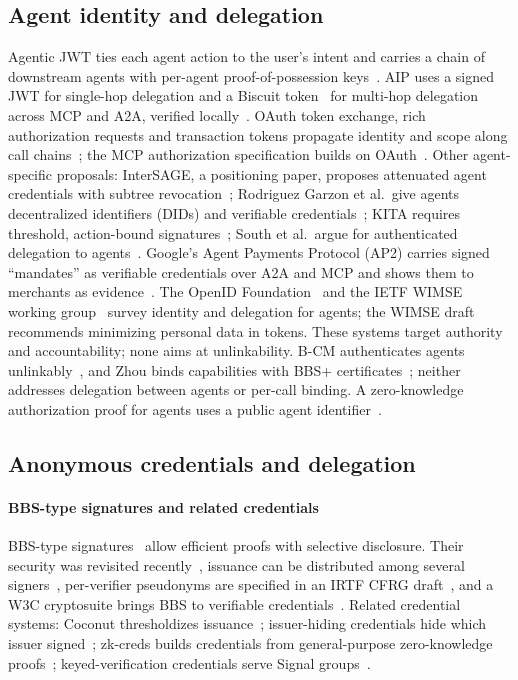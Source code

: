 \subsection{Agent identity and delegation}
Agentic JWT ties each agent action to the user's intent and carries a chain of downstream agents with per-agent proof-of-possession keys~\cite{goswami2025ajwt}. AIP uses a signed JWT for single-hop delegation and a Biscuit token~\cite{biscuit} for multi-hop delegation across MCP and A2A, verified locally~\cite{prakash2026aip}. OAuth token exchange, rich authorization requests and transaction tokens propagate identity and scope along call chains~\cite{rfc8693,rfc9396,tulshibagwale2026txntokens}; the MCP authorization specification builds on OAuth~\cite{mcpauth}. Other agent-specific proposals:
InterSAGE, a positioning paper, proposes attenuated agent credentials with subtree revocation~\cite{zou2026intersage}; Rodriguez Garzon et al.\ give agents decentralized identifiers (DIDs) and verifiable credentials~\cite{garzon2026didvc}; KITA requires threshold, action-bound signatures~\cite{zheng2026kita}; South et al.\ argue for authenticated delegation to agents~\cite{south2025icml}.
Google's Agent Payments Protocol (AP2) carries signed ``mandates'' as verifiable credentials over A2A and MCP and shows them to merchants as evidence~\cite{ap2-2025}. The OpenID Foundation~\cite{south2025idmgmt} and the IETF WIMSE working group~\cite{kasselman2026aims} survey identity and delegation for agents; the WIMSE draft recommends minimizing personal data in tokens. These systems target authority and accountability; none aims at unlinkability. B-CM authenticates agents unlinkably~\cite{liu2026bcm}, and Zhou binds capabilities with BBS+ certificates~\cite{zhou2026capbinding}; neither addresses delegation between agents or per-call binding. A zero-knowledge authorization proof for agents uses a public agent identifier~\cite{llambi2026cva}.

\subsection{Anonymous credentials and delegation}
\paragraph*{BBS-type signatures and related credentials} BBS-type signatures~\cite{bbs2004,au2006bbsplus,camenisch2016bbsplus} allow efficient proofs with selective disclosure. Their security was revisited recently~\cite{tessaro2023bbs,chairattana2025bbs}, issuance can be distributed among several signers~\cite{doerner2023threshold}, per-verifier pseudonyms are specified in an IRTF CFRG draft~\cite{kalos2026pseudonyms}, and a W3C cryptosuite brings BBS to verifiable credentials~\cite{w3c2026bbs}. Related credential systems:
Coconut thresholdizes issuance~\cite{sonnino2019coconut}; issuer-hiding credentials hide which issuer signed~\cite{bobolz2021ihabc,connolly2022spseq}; zk-creds builds credentials from general-purpose zero-knowledge proofs~\cite{rosenberg2023zkcreds}; keyed-verification credentials serve Signal groups~\cite{chase2020signal}.

